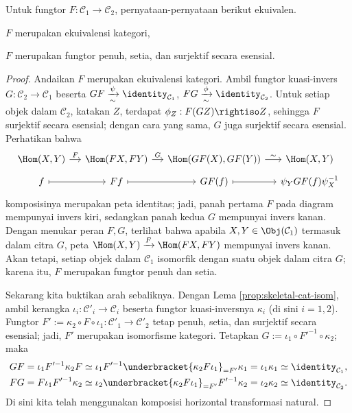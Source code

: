 \begin{theorem}\label{prop:functor-equiv-criterion}
	Untuk fungtor $F: \mathcal{C}_1 \to \mathcal{C}_2$, pernyataan-pernyataan berikut ekuivalen.
	\begin{compactenum}
		\item $F$ merupakan ekuivalensi kategori,
		\item $F$ merupakan fungtor penuh, setia, dan surjektif secara esensial.
	\end{compactenum}
\end{theorem}
\begin{proof}
	Andaikan $F$ merupakan ekuivalensi kategori. Ambil fungtor kuasi-invers $G: \mathcal{C}_2 \to \mathcal{C}_1$ beserta $GF \xrightarrow[\sim]{\psi} \identity_{\mathcal{C}_1}$, $FG \xrightarrow[\sim]{\phi} \identity_{\mathcal{C}_2}$. Untuk setiap objek dalam $\mathcal{C}_2$, katakan $Z$, terdapat $\phi_Z: F(GZ) \rightiso Z$, sehingga $F$ surjektif secara esensial; dengan cara yang sama, $G$ juga surjektif secara esensial. Perhatikan bahwa
	\[\begin{tikzcd}[row sep=tiny, column sep=small]
		\Hom(X,Y) \arrow[r, "F"] & \Hom(FX, FY) \arrow[r, "G"] & \Hom(GF(X), GF(Y)) \arrow[r, "\sim"] & \Hom(X, Y) \\
		f \arrow[mapsto, r] & Ff \arrow[mapsto, r] & GF(f) \arrow[mapsto, r] & \psi_Y GF(f) \psi_X^{-1}
	\end{tikzcd}\]
	komposisinya merupakan peta identitas; jadi, panah pertama $F$ pada diagram mempunyai invers kiri, sedangkan panah kedua $G$ mempunyai invers kanan. Dengan menukar peran $F, G$, terlihat bahwa apabila $X, Y \in \Obj(\mathcal{C}_1)$ termasuk dalam citra $G$, peta $\Hom(X, Y) \xrightarrow{F} \Hom(FX, FY)$ mempunyai invers kanan. Akan tetapi, setiap objek dalam $\mathcal{C}_1$ isomorfik dengan suatu objek dalam citra $G$; karena itu, $F$ merupakan fungtor penuh dan setia.

	Sekarang kita buktikan arah sebaliknya. Dengan Lema \ref{prop:skeletal-cat-isom}, ambil kerangka $\iota_i: \mathcal{C}'_i \rightarrow \mathcal{C}_i$ beserta fungtor kuasi-inversnya $\kappa_i$ (di sini $i=1,2$). Fungtor $F' := \kappa_2 \circ F \circ \iota_1: \mathcal{C}'_1 \to \mathcal{C}'_2$ tetap penuh, setia, dan surjektif secara esensial; jadi, $F'$ merupakan isomorfisme kategori. Tetapkan $G := \iota_1 \circ F'^{-1} \circ \kappa_2$; maka
	\begin{gather*}
		GF = \iota_1  F'^{-1} \kappa_2 F \simeq \iota_1  F'^{-1} \underbracket{\kappa_2 F \iota_1}_{= F'} \kappa_1 = \iota_1 \kappa_1 \simeq \identity_{\mathcal{C}_1}, \\
		FG = F \iota_1  F'^{-1} \kappa_2 \simeq \iota_2 \underbracket{\kappa_2 F \iota_1}_{= F'}  F'^{-1} \kappa_2 = \iota_2 \kappa_2 \simeq \identity_{\mathcal{C}_2}.
	\end{gather*}
	Di sini kita telah menggunakan komposisi horizontal transformasi natural.
\end{proof}

